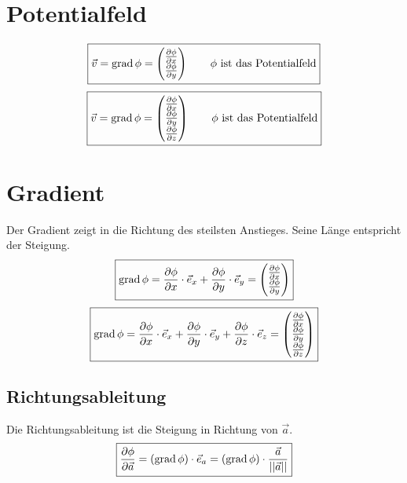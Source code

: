 \section{Potentialfeld}
\[ \boxed{\vec{v} = \grad \phi =
\left(\begin{array}{@{}l@{}} 
\frac{\partial \phi}{\partial x} \\
\frac{\partial \phi}{\partial y} \\
\end{array}\right) \qquad \text{$\phi$ ist das Potentialfeld}} \]
\[ \boxed{\vec{v} = \grad \phi =
\left(\begin{array}{@{}l@{}} 
\frac{\partial \phi}{\partial x} \\
\frac{\partial \phi}{\partial y} \\
\frac{\partial \phi}{\partial z} \\
\end{array}\right) \qquad \text{$\phi$ ist das Potentialfeld}} \]

\section{Gradient}\label{sec:gradient}
Der Gradient zeigt in die Richtung des steilsten Anstieges. Seine Länge 
entspricht der Steigung. 
\[ \boxed{\grad \phi = \frac{\partial \phi}{\partial x} \cdot \vec{e}_x 
+ \frac{\partial \phi}{\partial y} \cdot \vec{e}_y 
= \left(\begin{array}{@{}l@{}} 
\frac{\partial \phi}{\partial x} \\
\frac{\partial \phi}{\partial y} \\
\end{array}\right)} \]
\[ \boxed{\grad \phi = \frac{\partial \phi}{\partial x} \cdot \vec{e}_x 
+ \frac{\partial \phi}{\partial y} \cdot \vec{e}_y 
+ \frac{\partial \phi}{\partial z} \cdot \vec{e}_z 
= \left(\begin{array}{@{}l@{}} 
\frac{\partial \phi}{\partial x} \\
\frac{\partial \phi}{\partial y} \\
\frac{\partial \phi}{\partial z} \\
\end{array}\right)} \]

\subsection{Richtungsableitung}
Die Richtungsableitung ist die Steigung in Richtung von $\vec{a}$. 
\[ \boxed{\frac{\partial \phi}{\partial \vec{a}} 
= (\operatorname{grad} \phi) \cdot \vec{e}_a 
= (\operatorname{grad} \phi) \cdot \frac{\vec{a}}{||\vec{a}||}} \]

